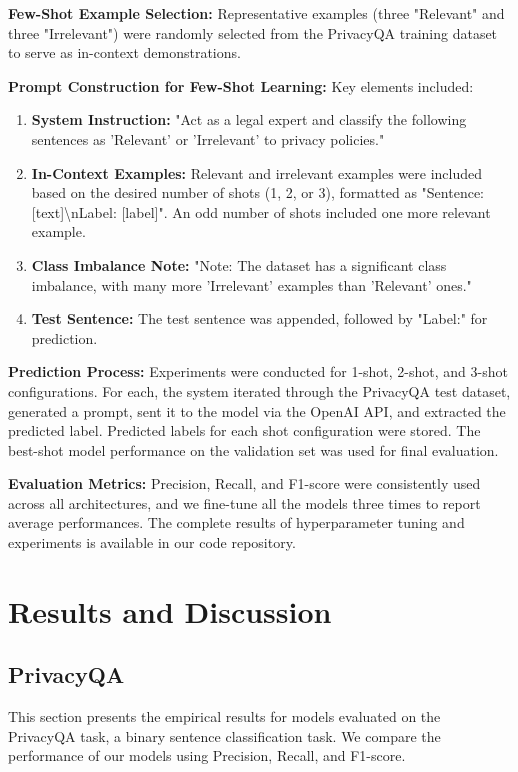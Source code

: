 \documentclass[11pt]{article}
\begin{document}
\textbf{Few-Shot Example Selection:} Representative examples (three "Relevant" and three "Irrelevant") were randomly selected from the PrivacyQA training dataset to serve as in-context demonstrations.

\textbf{Prompt Construction for Few-Shot Learning:}  Key elements included:
\begin{enumerate}
    \item \textbf{System Instruction:} "Act as a legal expert and classify the following sentences as 'Relevant' or 'Irrelevant' to privacy policies."
    \item \textbf{In-Context Examples:} Relevant and irrelevant examples were included based on the desired number of shots (1, 2, or 3), formatted as "Sentence: [text]\textbackslash nLabel: [label]". An odd number of shots included one more relevant example.
    \item \textbf{Class Imbalance Note:} "Note: The dataset has a significant class imbalance, with many more 'Irrelevant' examples than 'Relevant' ones."
    \item \textbf{Test Sentence:} The test sentence was appended, followed by "Label:" for prediction.
\end{enumerate}

\textbf{Prediction Process:} Experiments were conducted for 1-shot, 2-shot, and 3-shot configurations. For each, the system iterated through the PrivacyQA test dataset, generated a prompt, sent it to the model via the OpenAI API, and extracted the predicted label. Predicted labels for each shot configuration were stored. The best-shot model performance on the validation set was used for final evaluation.

\textbf{Evaluation Metrics:} Precision, Recall, and F1-score were consistently used across all architectures, and we fine-tune all the models three times to report average performances. The complete results of hyperparameter tuning and experiments is available in our code repository.

\section{Results and Discussion}

\subsection{PrivacyQA}

This section presents the empirical results for models evaluated on the PrivacyQA task, a binary sentence classification task. We compare the performance of our models using Precision, Recall, and F1-score.
\end{document}
